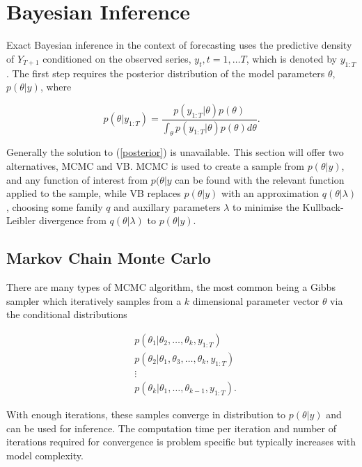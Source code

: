 \documentclass[12pt,a4paper]{article}%
\numberwithin{equation}{section}
\begin{document}
\section{Bayesian Inference}

Exact Bayesian inference in the context of forecasting uses the predictive density of $Y_{T+1}$ conditioned on the observed series, $y_{t}, t = 1, \dots T$, which is denoted by $y_{1:T}$. The first step requires the posterior distribution of the model parameters $\theta$, $p(\theta | y)$, where

\begin{equation}
\label{posterior}
 p(\theta | y_{1:T}) = \frac{p(y_{1:T}|\theta)p(\theta)}{\int_\theta p(y_{1:T}|\theta)p(\theta) d\theta}.
\end{equation}

Generally the solution to (\ref{posterior}) is unavailable. This section will offer two alternatives, MCMC and VB.
MCMC is used to create a sample from $p(\theta | y)$, and any function of interest from $p(\theta | y$ can be found with the relevant function applied to the sample, while VB replaces $p(\theta | y)$ with an approximation $q(\theta | \lambda)$, choosing some family $q$ and auxillary parameters $\lambda$ to minimise the Kullback-Leibler divergence from $q(\theta | \lambda)$ to $p(\theta | y)$.

\subsection{Markov Chain Monte Carlo}

There are many types of MCMC algorithm, the most common being a Gibbs sampler which iteratively samples from a $k$ dimensional parameter vector $\theta$ via the conditional distributions

\begin{align}
&p(\theta_1 | \theta_2, \dots, \theta_k, y_{1:T}) \nonumber \\
&p(\theta_2 | \theta_1, \theta_3, \dots, \theta_k, y_{1:T}) \nonumber \\
&\vdots \nonumber \\
&p(\theta_k | \theta_1, \dots, \theta_{k-1}, y_{1:T}). \nonumber
\end{align}

With enough iterations, these samples converge in distribution to $p(\theta | y)$ and can be used for inference. The computation time per iteration and number of iterations required for convergence is problem specific but typically increases with model complexity. 
\end{document}
